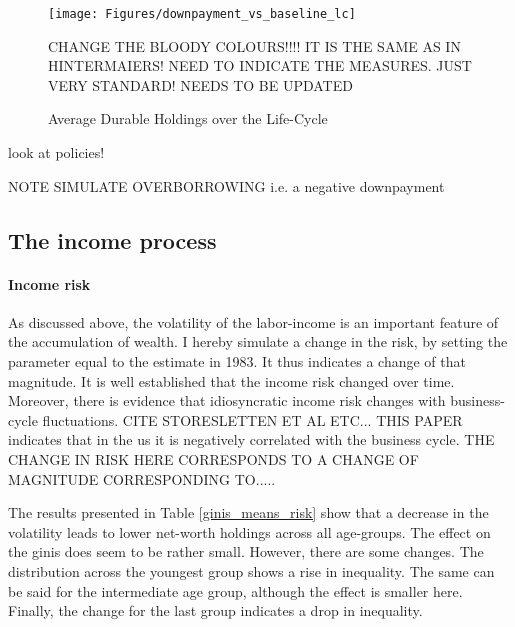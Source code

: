 \documentclass[a4paper,12pt,legno]{article}
\begin{document}
\begin{figure}[!htbp]
\caption{Average Durable Holdings over the Life-Cycle} 
\label{downpayment_vs_baseline_lc}	%
\centering
\texttt{[image: Figures/downpayment\_vs\_baseline\_lc]}  %

\begin{minipage}{0.8\linewidth}
\footnotesize{CHANGE THE BLOODY COLOURS!!!! IT IS THE SAME AS IN HINTERMAIERS! NEED TO INDICATE THE MEASURES. JUST VERY STANDARD! NEEDS TO BE UPDATED}
\end{minipage}

\end{figure}


look at policies! 

NOTE SIMULATE OVERBORROWING i.e. a negative downpayment

\subsection{The income process}
\paragraph{Income risk} As discussed above, the volatility of the labor-income is an important feature of the accumulation of wealth. I hereby simulate a change in the risk, by setting the parameter equal to the estimate in 1983. It thus indicates a change of that magnitude. It is well established that the income risk changed over time. Moreover, there is evidence that idiosyncratic income risk changes with business-cycle fluctuations. CITE STORESLETTEN ET AL ETC... THIS PAPER indicates that in the us it is negatively correlated with the business cycle. THE CHANGE IN RISK HERE CORRESPONDS TO A CHANGE OF MAGNITUDE CORRESPONDING TO.....

The results presented in Table \ref{ginis_means_risk} show that a decrease in the volatility leads to lower net-worth holdings across all age-groups. The effect on the ginis does seem to be rather small. However, there are some changes. The distribution across the youngest group shows a rise in inequality. The same can be said for the intermediate age group, although the effect is smaller here. Finally, the change for the last group indicates a drop in inequality. 
\end{document}
